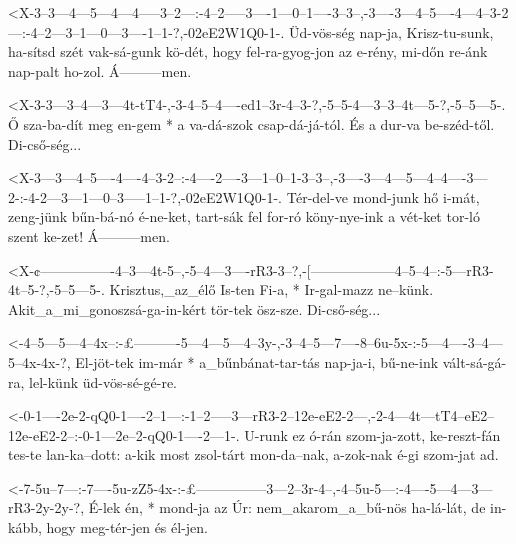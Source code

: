 

  {<X-3--3---4---5---4---4-----3--2---:-4--2-----3----1---0--1----3--3--,-3----3---4--5----4---4--3-2---:-4--2---3--1---0---3----1--1-?,-02eE2W1Q0-1-.}
  {   Üd-vös-ség nap-ja, Krisz-tu-sunk, ha-sítsd szét vak-sá-gunk kö-dét, hogy fel-ra-gyog-jon az e-rény, mi-dőn re-ánk nap-palt ho-zol. Á---------men.}

  {<X-3-3---3--4---3---4t-tT4-,-3-4--5--4----ed1--3r-4--3-?,-5--5-4---3--3--4t---5-?,-5--5---5-.}
  {   Ő sza-ba-dít meg en-gem * a va-dá-szok csap-dá-já-tól. És a dur-va be-széd-től. Di-cső-ség...}

  {<X-3---3---4--5----4----4--3-2--:-4----2----3---1--0--1-3--3--,-3----3---4---5---4--4----3---2-:-4-2---3---1---0--3-----1--1-?,-02eE2W1Q0-1-.}
  {   Tér-del-ve mond-junk hő i-mát, zeng-jünk bűn-bá-nó é-ne-ket, tart-sák fel for-ró köny-nye-ink a vét-ket tor-ló szent ke-zet! Á---------men.}

  {<X-¢----------------4--3---4t-5--,-5--4---3----rR3-3--?,-[------------------4--5--4--:-5---rR3-4t--5-?,-5--5---5-.}
  {   Krisztus,_az_élő Is-ten Fi-a, * Ir-gal-mazz ne--künk. Akit_a_mi_gonoszsá-ga-in-kért tör-tek ösz-sze. Di-cső-ség...}



  {<-4--5---5---4--4x--:-£----------5---4---5---4--3y-,-3--4--5---7----8--6u-5x-:-5---4----3--4---5--4x-4x-?,}
  {  El-jöt-tek im-már * a_bűnbánat-tar-tás nap-ja-i,   bű-ne-ink vált-sá-gá-ra,  lel-künk üd-vös-sé-gé-re.}


  {<-0-1----2e-2-qQ0-1----2--1---:-1--2-----3---rR3-2--12e-eE2-2---,-2-4---4t---tT4--eE2--12e-eE2-2--:-0-1---2e--2-qQ0-1----2---1-.}
  {  U-runk ez ó-rán szom-ja-zott, ke-reszt-fán tes-te lan-ka--dott: a-kik most zsol-tárt mon-da--nak, a-zok-nak é-gi  szom-jat ad.}

  {<-7-5u--7---:-7----5u-zZ5-4x-:-£---------------3---2--3r-4--,-4--5u-5---:-4----5---4---3---rR3-2y-2y-?,}
  {  É-lek én, * mond-ja az  Úr:  nem_akarom_a_bű-nös ha-lá-lát, de in-kább, hogy meg-tér-jen és  él-jen.}

